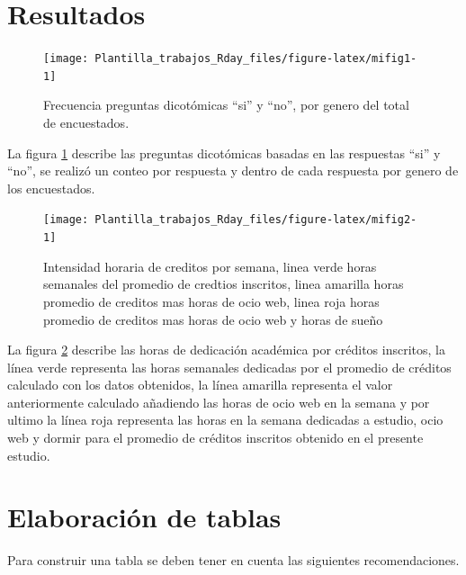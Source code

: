 \documentclass[]{article}
\begin{document}
\hypertarget{resultados}{%
\section{Resultados}\label{resultados}}

\begin{figure}

{\centering \texttt{[image: Plantilla\_trabajos\_Rday\_files/figure-latex/mifig1-1]} 

}

\caption{Frecuencia preguntas dicotómicas “si” y  “no”, por genero del total de encuestados. }\label{fig:mifig1}
\end{figure}

La figura \ref{fig:mifig1} describe las preguntas dicotómicas basadas en
las respuestas ``si'' y ``no'', se realizó un conteo por respuesta y
dentro de cada respuesta por genero de los encuestados. \newline

\begin{figure}

{\centering \texttt{[image: Plantilla\_trabajos\_Rday\_files/figure-latex/mifig2-1]} 

}

\caption{Intensidad horaria de creditos por semana, linea verde horas semanales del promedio de credtios inscritos, linea amarilla horas promedio de creditos mas horas de ocio web, linea roja horas promedio de creditos mas horas de ocio web y horas de sueño }\label{fig:mifig2}
\end{figure}

La figura \ref{fig:mifig2} describe las horas de dedicación académica
por créditos inscritos, la línea verde representa las horas semanales
dedicadas por el promedio de créditos calculado con los datos obtenidos,
la línea amarilla representa el valor anteriormente calculado añadiendo
las horas de ocio web en la semana y por ultimo la línea roja representa
las horas en la semana dedicadas a estudio, ocio web y dormir para el
promedio de créditos inscritos obtenido en el presente estudio.

\hypertarget{elaboracion-de-tablas}{%
\section{Elaboración de tablas}\label{elaboracion-de-tablas}}

Para construir una tabla se deben tener en cuenta las siguientes
recomendaciones.
\end{document}
